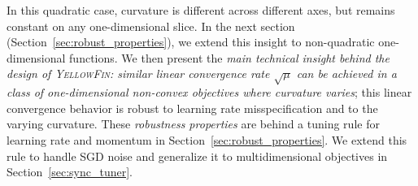 \documentclass{article}
\newcommand{\tuner}{\textsc{YellowFin}\xspace}
\begin{document}
In this quadratic case, curvature is different across different axes, but remains {constant on any one-dimensional slice}. 
In the next section (Section~\ref{sec:robust_properties}), we extend this insight to non-quadratic one-dimensional functions.
We then present the \emph{main technical insight behind the design of \tuner: 
similar linear convergence rate $\sqrt{\mu}$ can be achieved in a class of one-dimensional non-convex objectives where curvature varies}; this linear convergence behavior is robust to learning rate misspecification and to the varying curvature. These \emph{robustness properties} are behind a tuning rule for learning rate and momentum in Section~\ref{sec:robust_properties}. We extend this rule to handle SGD noise and generalize it to multidimensional objectives in Section~\ref{sec:sync_tuner}.

\end{document}

